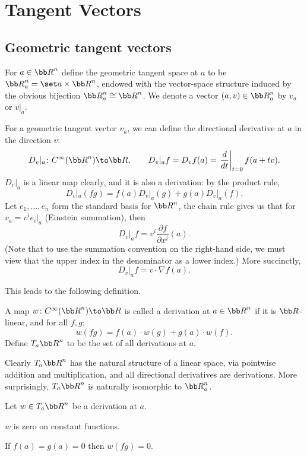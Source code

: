 \section{Tangent Vectors}

\subsection{Geometric tangent vectors}

\bdefn

    For $a\in\bR^n$ define the {\emphcolor geometric tangent space} at $a$ to be $\bR^n_a=\set a\times\bR^n$, endowed with the
    vector-space structure induced by the obvious bijection $\bR^n_a\cong\bR^n$.
    We denote a vector $(a,v)\in\bR^n_a$ by $v_a$ or $v|_a$.

\edefn

For a geometric tangent vector $v_a$, we can define the {\emphcolor directional derivative} at $a$ in the direction $v$:
$$ D_v|_a\colon C^\infty(\bR^n)\to\bR,\qquad D_v|_af = D_vf(a) = \eval{\frac d{dt}}_{t=0}f(a+tv) . $$
$D_v|_a$ is a linear map clearly, and it is also a {\emphcolor derivation}: by the product rule,
$$ D_v|_a(fg) = f(a)D_v|_a(g) + g(a)D_v|_a(f) . $$
Let $e_1,\dots,e_n$ form the standard basis for $\bR^n$, the chain rule gives us that for $v_a=v^ie_i|_a$ (Einstein summation),
then
$$ D_v|_af = v^i\frac{\partial f}{\partial x^i}(a) . $$
(Note that to use the summation convention on the right-hand side, we must view that the upper index in the denominator as a lower index.)
More succinctly,
$$ D_v|_af = v\cdot\nabla f(a) . $$

This leads to the following definition.

\bdefn

    A map $w\colon C^\infty(\bR^n)\to\bR$ is called a {\emphcolor derivation} at $a\in\bR^n$ if it is $\bR$-linear, and for all
    $f,g$:
    $$ w(fg) = f(a)\cdot w(g) + g(a)\cdot w(f) . $$
    Define $T_a\bR^n$ to be the set of all derivations at $a$.

\edefn

Clearly $T_a\bR^n$ has the natural structure of a linear space, via pointwise addition and multiplication, and all directional derivatives
are derivations.
More surprisingly, $T_a\bR^n$ is naturally isomorphic to $\bR^n_a$.

\blemm

    Let $w\in T_a\bR^n$ be a derivation at $a$.
    \benum
        \item $w$ is zero on constant functions.
        \item If $f(a)=g(a)=0$ then $w(fg)=0$.
    \eenum


